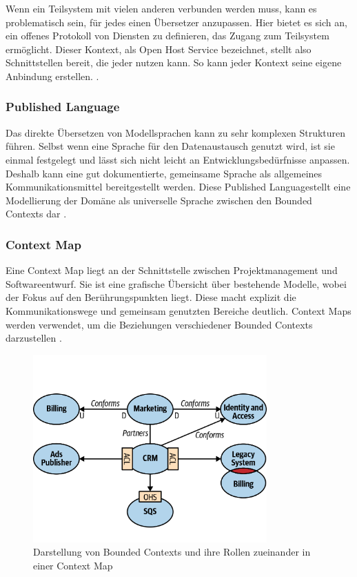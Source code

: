 {Wenn ein Teilsystem mit vielen anderen verbunden werden muss, kann es problematisch sein, für jedes einen Übersetzer anzupassen. Hier bietet es sich an, ein offenes Protokoll von Diensten zu definieren, das Zugang zum Teilsystem ermöglicht. Dieser Kontext, als \glqq Open Host Service\grqq{} bezeichnet, stellt also Schnittstellen bereit, die jeder nutzen kann. So kann jeder Kontext seine eigene Anbindung erstellen.
\cite[S. 374]{evans} \cite[S. 48]{wolff} \cite[S.66]{dowalil}.

\subsubsection{Published Language}

Das direkte Übersetzen von Modellsprachen kann zu sehr komplexen Strukturen führen. Selbst wenn eine Sprache für den Datenaustausch genutzt wird, ist sie einmal festgelegt und lässt sich nicht leicht an Entwicklungsbedürfnisse anpassen. Deshalb kann eine gut dokumentierte, gemeinsame Sprache als allgemeines Kommunikationsmittel bereitgestellt werden. Diese \glqq Published Language\grqq stellt eine Modellierung der Domäne als universelle Sprache zwischen den Bounded Contexts dar \cite[S. 375-378]{evans} \cite[S. 48]{wolff} \cite[S.65]{dowalil}.

\subsubsection{Context Map}

Eine \glqq Context Map\grqq{} liegt an der Schnittstelle zwischen Projektmanagement und Softwareentwurf. Sie ist eine grafische Übersicht über bestehende Modelle, wobei der Fokus auf den Berührungspunkten liegt. Diese macht explizit die Kommunikationswege und gemeinsam genutzten Bereiche deutlich. Context Maps werden verwendet, um die Beziehungen verschiedener Bounded Contexts darzustellen \cite[S. 344 - 353]{evans} \cite[S. 45]{wolff}.

\begin{figure}[ht]
\centering
\includegraphics[width=0.8\textwidth]{bilder/k2/k2_context_map.png}
\caption[Darstellung von Bounded Contexts und ihre Rollen in der Context Map]{Darstellung von Bounded Contexts und ihre Rollen zueinander in einer Context Map \cite{oreillymap}}
\end{figure}


}
